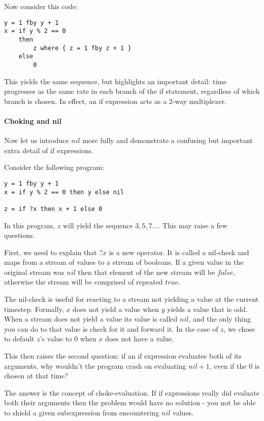 \documentclass{scrartcl}
\begin{document}
    Now consider this code:
    
    \begin{lstlisting}
y = 1 fby y + 1
x = if y % 2 == 0
    then
        z where { z = 1 fby z + 1 }
    else
        0
    \end{lstlisting}
    
    This yields the same sequence, but highlights an important detail: time progresses as the same rate in each branch of the if statement, regardless of which branch is chosen. In effect, an if expression acts as a 2-way multiplexer.
    
    \paragraph{Choking and nil}
    
    Now let us introduce $nil$ more fully and demonstrate a confusing but important extra detail of if expressions.
    
    Consider the following program:
    
    \begin{lstlisting}
y = 1 fby y + 1
x = if y % 2 == 0 then y else nil

z = if ?x then x + 1 else 0
    \end{lstlisting}
    
    In this program, $z$ will yield the sequence $3, 5, 7 ...$. This may raise a few questions.
    
    First, we need to explain that $?x$ is a new operator. It is called a nil-check and maps from a stream of values to a stream of booleans. If a given value in the original stream was $nil$ then that element of the new stream will be $false$, otherwise the stream will be comprised of repeated $true$.
    
    The nil-check is useful for reacting to a stream not yielding a value at the current timestep. Formally, $x$ does not yield a value when $y$ yields a value that is odd. When a stream does not yield a value its value is called $nil$, and the only thing you can do to that value is check for it and forward it. In the case of $z$, we chose to default $z$'s value to $0$ when $x$ does not have a value.
    
    This then raises the second question: if an if expression evaluates both of its arguments, why wouldn't the program crash on evaluating $nil + 1$, even if the $0$ is chosen at that time?
    
    The answer is the concept of choke-evaluation. If if expressions really did evaluate both their arguments then the problem would have no solution - you not be able to shield a given subexpression from encountering $nil$ values.
    
\end{document}
